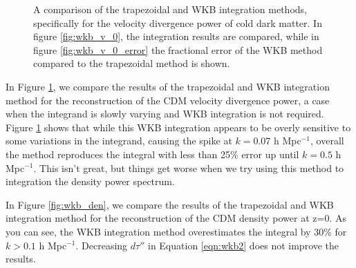 \documentclass[superscriptaddress,prd]{revtex4}
\begin{document}
\begin{figure}[h!]
  \centering
  \caption{A comparison of the trapezoidal and WKB integration
    methods, specifically for the velocity divergence power of cold
    dark matter.  In figure \ref{fig:wkb_v_0}, the integration results
  are compared, while in figure \ref{fig:wkb_v_0_error} the fractional
error of the WKB method compared to the trapezoidal method is shown.}\label{fig:wkb_v}
\end{figure}


In Figure \ref{fig:wkb_v}, we compare the results of the
trapezoidal and WKB integration method for the
reconstruction of the CDM velocity divergence power, a
case when the integrand is slowly varying and WKB integration is not
required.  Figure \ref{fig:wkb_v} shows that while this WKB integration
appears to be overly sensitive to some variations in the integrand, 
causing the spike at $k=0.07$ h Mpc$^{-1}$, overall the
method reproduces the integral with less than 25\% error up until
$k=0.5$ h Mpc$^{-1}$.  This isn't great, but things get worse when we try using this method to integration the density power spectrum. 

In Figure \ref{fig:wkb_den}, we compare the results of the trapezoidal and WKB integration method for the reconstruction of the CDM density power at z=0.  As you can see, the WKB integration method overestimates the integral by 30\% for $k>0.1$ h Mpc$^{-1}$.  Decreasing $d\tau''$ in Equation \eqref{eqn:wkb2} does not improve the results.
\end{document}

